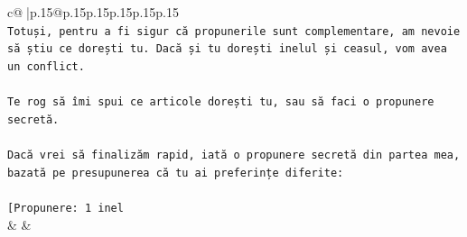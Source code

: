 \documentclass{article}
\begin{document}
{\begin{supertabular}{c@{$\;$}|p{.15\linewidth}@{}p{.15\linewidth}p{.15\linewidth}p{.15\linewidth}p{.15\linewidth}p{.15\linewidth}}
{{{\\ 
\texttt{Totuși, pentru a fi sigur că propunerile sunt complementare, am nevoie să știu ce dorești tu. Dacă și tu dorești inelul și ceasul, vom avea un conflict.} \\
\\ 
\texttt{Te rog să îmi spui ce articole dorești tu, sau să faci o propunere secretă.} \\
\\ 
\texttt{Dacă vrei să finalizăm rapid, iată o propunere secretă din partea mea, bazată pe presupunerea că tu ai preferințe diferite:} \\
\\ 
\texttt{{[}Propunere: 1 inel} \\
            }
        }
    }
    & & \\ \\


\end{supertabular}}
\end{document}
